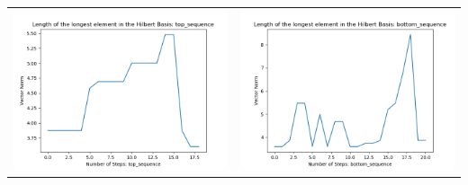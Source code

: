 \documentclass[10pt]{article}
\begin{document}
\begin{tabular}{c|c}
\begin{minipage}{.45\textwidth}
\includegraphics[width=\textwidth]{"DATA/4d/5 generators 2 bound A/top_sequence LENGTH"}
\end{minipage} &
\begin{minipage}{.45\textwidth}
\includegraphics[width=\textwidth]{"DATA/4d/5 generators 2 bound A bottomup/bottom_sequence LENGTH"}
\end{minipage}
\end{tabular}
\end{document}
